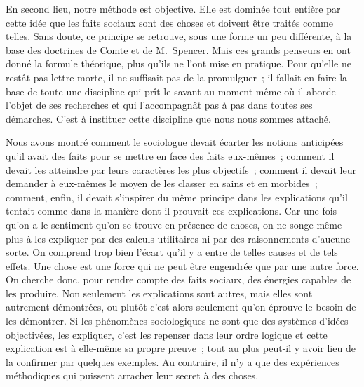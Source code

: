 \documentclass[french,twoside]{book} %
\begin{document}
En second lieu, notre méthode est objective. Elle est dominée tout entière par cette idée que les faits sociaux sont des choses et doivent être traités comme telles. Sans doute, ce principe se retrouve, sous une forme un peu différente, à la base des doctrines de Comte et de M. Spencer. Mais ces grands penseurs en ont donné la formule théorique, plus qu’ils ne l’ont mise en pratique. Pour qu’elle ne restât pas lettre morte, il ne suffisait pas de la promulguer ; il fallait en faire la base de toute une discipline qui prît le savant au moment même où il aborde l’objet de ses recherches et qui l’accompagnât pas à pas dans toutes ses démarches. C’est à instituer cette discipline que nous nous sommes attaché.\par
Nous avons montré comment le sociologue devait écarter les notions anticipées qu’il avait des faits pour se mettre en face des faits eux-mêmes ; comment il devait les atteindre par leurs caractères les plus objectifs ; comment il devait leur demander à eux-mêmes le moyen de les classer en sains et en morbides ; comment, enfin, il devait s’inspirer du même principe dans les explications qu’il tentait comme dans la manière dont il prouvait ces explications. Car une fois qu’on a le sentiment qu’on se trouve en présence de choses, on ne songe même plus à les expliquer par des calculs utilitaires ni par des raisonnements d’aucune sorte. On comprend trop bien l’écart qu’il y a entre de telles causes et de tels effets. Une chose est une force qui ne peut être engendrée que par une autre force. On cherche donc, pour rendre compte des faits sociaux, des énergies capables de les produire. Non seulement les explications sont autres, mais elles sont autrement démontrées, ou plutôt c’est alors seulement qu’on éprouve le besoin de les démontrer. Si les phénomènes sociologiques ne sont que des systèmes d’idées objectivées, les expliquer, c’est les repenser dans leur ordre logique et cette explication est à elle-même sa propre preuve ; tout au plus peut-il y avoir lieu de la confirmer par quelques exemples. Au contraire, il n’y a que des expériences méthodiques qui puissent arracher leur secret à des choses.\par
\end{document}
